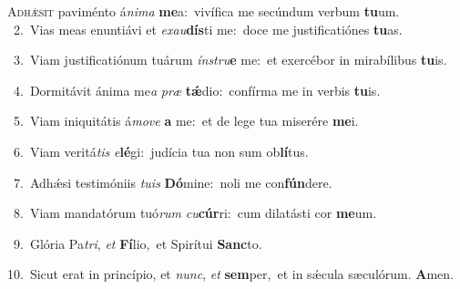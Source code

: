 \lettrine{\initial\textcolor{\initialcolor}{A}}{dhǽsit} paviménto á\-\textit{ni}\-\textit{ma} \textbf{me}\-a:~\star vivífica me secúndum verbum \textbf{tu}\-um.\\
{\numbfont\textcolor{\numbcolor}{~2.}}~Vias meas enuntiávi et \textit{ex}\-\textit{au}\textbf{dís}ti me:~\star doce me justificatiónes \textbf{tu}\-as.\par
{\numbfont\textcolor{\numbcolor}{~3.}}~Viam justificatiónum tuárum \textit{ín}\-\textit{stru}\textbf{e} me:~\star et exercébor in mirabílibus \textbf{tu}\-is.\par
{\numbfont\textcolor{\numbcolor}{~4.}}~Dormitávit ánima me\textit{a} \textit{præ} \textbf{tǽ}\-dio:~\star confírma me in verbis \textbf{tu}\-is.\par
{\numbfont\textcolor{\numbcolor}{~5.}}~Viam iniquitátis á\-\textit{mo}\-\textit{ve} \textbf{a} me:~\star et de lege tua miserére \textbf{me}\-i.\par
{\numbfont\textcolor{\numbcolor}{~6.}}~Viam veritá\textit{tis} \textit{e}\-\textbf{lé}gi:~\star judícia tua non sum ob\-\textbf{lí}\-tus.\par
{\numbfont\textcolor{\numbcolor}{~7.}}~Adhǽsi testimóniis \textit{tu}\-\textit{is} \textbf{Dó}\-mine:~\star noli me con\-\textbf{fún}\-dere.\par
{\numbfont\textcolor{\numbcolor}{~8.}}~Viam mandatórum tuó\textit{rum} \textit{cu}\-\textbf{cúr}ri:~\star cum dilatásti cor \textbf{me}\-um.\par
{\numbfont\textcolor{\numbcolor}{~9.}}~Glória Pa\-\textit{tri}\-, \textit{et} \textbf{Fí}\-lio,~\star et Spirítui \textbf{Sanc}\-to.\par
{\numbfont\textcolor{\numbcolor}{10.}}~Sicut erat in princípio, et \textit{nunc}\-, \textit{et} \textbf{sem}\-per,~\star et in sǽcula sæculórum. \textbf{A}\-men.\par
